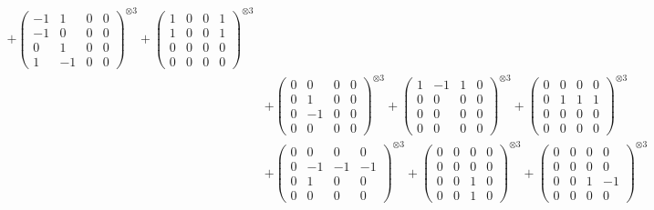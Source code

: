 \documentclass{article}
\begin{document}
{\begin{align}
            + \begin{pmatrix} -1 & 1 & 0 & 0 \\ -1 & 0 & 0 & 0 \\ 0 & 1 & 0 & 0 \\ 1 & -1 & 0 & 0 \end{pmatrix}^{\otimes 3} 
            + \begin{pmatrix} 1 & 0 & 0 & 1 \\ 1 & 0 & 0 & 1 \\ 0 & 0 & 0 & 0 \\ 0 & 0 & 0 & 0 \end{pmatrix}^{\otimes 3} \\
        &+ \label{Rs16-Rc11-Solution-26-c10} \begin{pmatrix} 0 & 0 & 0 & 0 \\ 0 & 1 & 0 & 0 \\ 0 & -1 & 0 & 0 \\ 0 & 0 & 0 & 0 \end{pmatrix}^{\otimes 3} 
            + \begin{pmatrix} 1 & -1 & 1 & 0 \\ 0 & 0 & 0 & 0 \\ 0 & 0 & 0 & 0 \\ 0 & 0 & 0 & 0 \end{pmatrix}^{\otimes 3} 
            + \begin{pmatrix} 0 & 0 & 0 & 0 \\ 0 & 1 & 1 & 1 \\ 0 & 0 & 0 & 0 \\ 0 & 0 & 0 & 0 \end{pmatrix}^{\otimes 3} \\
        &+ \label{Rs16-Rc11-Solution-26-c13} \begin{pmatrix} 0 & 0 & 0 & 0 \\ 0 & -1 & -1 & -1 \\ 0 & 1 & 0 & 0 \\ 0 & 0 & 0 & 0 \end{pmatrix}^{\otimes 3} 
            + \begin{pmatrix} 0 & 0 & 0 & 0 \\ 0 & 0 & 0 & 0 \\ 0 & 0 & 1 & 0 \\ 0 & 0 & 1 & 0 \end{pmatrix}^{\otimes 3} 
            + \begin{pmatrix} 0 & 0 & 0 & 0 \\ 0 & 0 & 0 & 0 \\ 0 & 0 & 1 & -1 \\ 0 & 0 & 0 & 0 \end{pmatrix}^{\otimes 3} \\

\end{align}}
\end{document}
